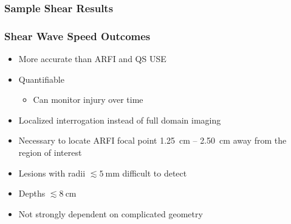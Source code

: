 \documentclass{beamer}
\begin{document}
		\begin{frame}
			\frametitle{Sample Shear Results}
			\begin{figure}
				\centering
				\vspace{-0.25cm}
			\end{figure}
		\end{frame}

		\begin{frame}
			\frametitle{Shear Wave Speed Outcomes}
			\begin{itemize}
				\item More accurate than ARFI and QS USE
				\item Quantifiable
				\begin{itemize}
					\item Can monitor injury over time
				\end{itemize}
				\item Localized  interrogation instead of full domain imaging
				\item Necessary to locate ARFI focal point \SI{1.25}{\cm} -- \SI{2.50}{\cm} away from the region of interest
				\item Lesions with radii $\lesssim \SI{5}{\mm}$ difficult to detect
				\item Depths $\lesssim \SI{8}{\cm}$
				\item Not strongly dependent on complicated geometry
			\end{itemize}
		\end{frame}
\end{document}

